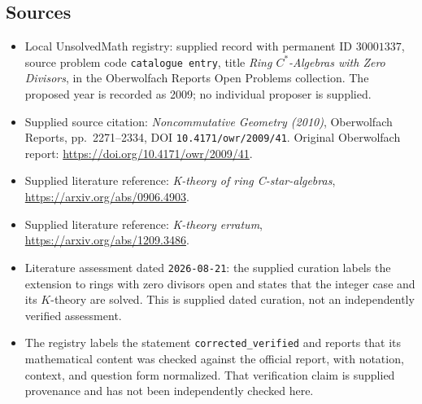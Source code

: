 \documentclass[11pt]{article}
\begin{document}
\subsection{Sources}
\begin{itemize}
\item Local UnsolvedMath registry: supplied record with permanent ID \(30001337\), source problem code \texttt{catalogue entry}, title \emph{Ring \(C^*\)-Algebras with Zero Divisors}, in the Oberwolfach Reports Open Problems collection. The proposed year is recorded as 2009; no individual proposer is supplied.
\item Supplied source citation: \emph{Noncommutative Geometry (2010)}, Oberwolfach Reports, pp.\ 2271--2334, DOI \texttt{10.4171/owr/2009/41}. Original Oberwolfach report: \url{https://doi.org/10.4171/owr/2009/41}.
\item Supplied literature reference: \emph{K-theory of ring C-star-algebras}, \url{https://arxiv.org/abs/0906.4903}.
\item Supplied literature reference: \emph{K-theory erratum}, \url{https://arxiv.org/abs/1209.3486}.
\item Literature assessment dated \texttt{2026-08-21}: the supplied curation labels the extension to rings with zero divisors open and states that the integer case and its \(K\)-theory are solved. This is supplied dated curation, not an independently verified assessment.
\item The registry labels the statement \texttt{corrected\_verified} and reports that its mathematical content was checked against the official report, with notation, context, and question form normalized. That verification claim is supplied provenance and has not been independently checked here.
\end{itemize}
\end{document}
